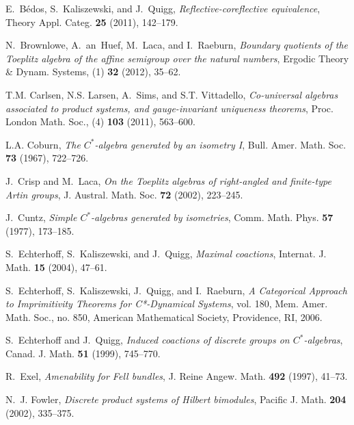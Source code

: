 \documentclass[12pt]{amsart}
\theoremstyle{plain}
\theoremstyle{remark}
\theoremstyle{definition}
\numberwithin{equation}{section}
\theoremstyle{plain}
\theoremstyle{definition}
\theoremstyle{remark}
\begin{document}
\providecommand{\bysame}{\leavevmode\hbox to3em{\hrulefill}\thinspace}
\providecommand{\MR}{\relax\ifhmode\unskip\space\fi MR }
\providecommand{\MRhref}[2]{  \href{http://www.ams.org/mathscinet-getitem?mr=#1}{#2}
}
\providecommand{\href}[2]{#2}
\begin{thebibliography}{EKQR06}

E.~B{\'e}dos, S.~Kaliszewski, and J.~Quigg, \emph{Reflective-coreflective
  equivalence}, Theory Appl. Categ. \textbf{25} (2011), 142--179.

N.~Brownlowe, A.~an~Huef, M.~Laca, and I.~Raeburn, \emph{Boundary quotients of
  the {T}oeplitz algebra of the affine semigroup over the natural numbers},
  Ergodic Theory \& Dynam. Systems, (1) \textbf{32} (2012), 35--62.

T.M. Carlsen, N.S. Larsen, A.~Sims, and S.T. Vittadello, \emph{Co-universal
  algebras associated to product systems, and gauge-invariant uniqueness
  theorems}, Proc. London Math. Soc., (4) \textbf{103} (2011), 563--600.

L.A. Coburn, \emph{The ${C}^*$-algebra generated by an isometry {I}}, Bull.
  Amer. Math. Soc. \textbf{73} (1967), 722--726.

J.~Crisp and M.~Laca, \emph{On the {T}oeplitz algebras of right-angled and
  finite-type {A}rtin groups}, J. Austral. Math. Soc. \textbf{72} (2002),
  223--245.

J.~Cuntz, \emph{Simple ${C}^*$-algebras generated by isometries}, Comm. Math.
  Phys. \textbf{57} (1977), 173--185.

S.~Echterhoff, S.~Kaliszewski, and J.~Quigg, \emph{Maximal coactions},
  Internat. J. Math. \textbf{15} (2004), 47--61.

S.~Echterhoff, S.~Kaliszewski, J.~Quigg, and I.~Raeburn, \emph{{A Categorical
  Approach to Imprimitivity Theorems for C*-Dynamical Systems}}, vol. 180, Mem.
  Amer. Math. Soc., no. 850, American Mathematical Society, Providence, RI,
  2006.

S.~Echterhoff and J.~Quigg, \emph{Induced coactions of discrete groups on
  {$C^*$}-algebras}, Canad. J. Math. \textbf{51} (1999), 745--770.

R.~Exel, \emph{Amenability for {F}ell bundles}, J. Reine Angew. Math.
  \textbf{492} (1997), 41--73.

N.~J. Fowler, \emph{Discrete product systems of {H}ilbert bimodules}, Pacific
  J. Math. \textbf{204} (2002), 335--375.


\end{thebibliography}
\end{document}
